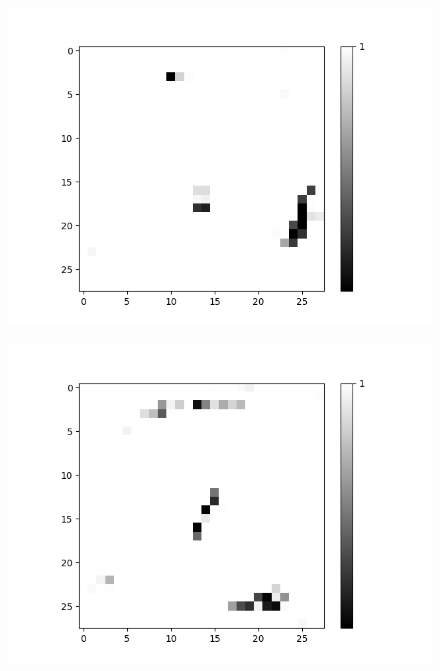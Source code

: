 \begin{minipage}[t]{0.6\textwidth}
	\vspace{0px}
	\begin{figure}[H]
		\centering
		\begin{minipage}[b]{0.24\textwidth}
			\captionsetup{labelformat=empty}
			\includegraphics[width=\textwidth]{OR-AND(WO-LSM)(1)/Like/True/Layer0-Neuron-0.png}
			\label{}
		\end{minipage}
		\begin{minipage}[b]{0.24\textwidth}
			\captionsetup{labelformat=empty}
			\includegraphics[width=\textwidth]{OR-AND(WO-LSM)(1)/Like/True/Layer0-Neuron-3.png}

\end{minipage}
\end{figure}
\end{minipage}
